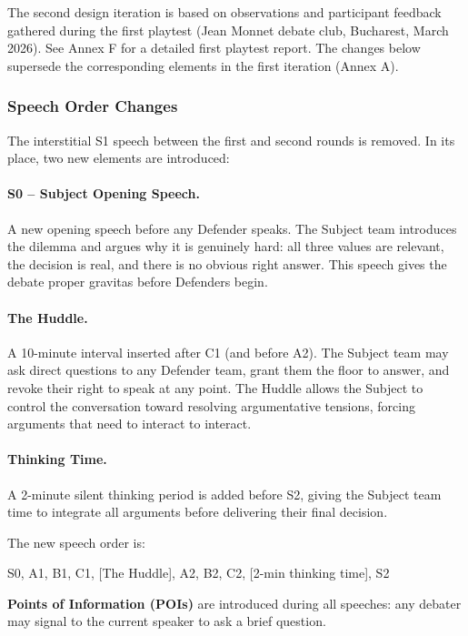 The second design iteration is based on observations and participant feedback gathered during the first playtest (Jean Monnet debate club, Bucharest, March 2026). See Annex F for a detailed first playtest report. The changes below supersede the corresponding elements in the first iteration (Annex A).

\subsubsection{Speech Order Changes}

The interstitial S1 speech between the first and second rounds is removed. In its place, two new elements are introduced:

\paragraph{S0 -- Subject Opening Speech.} A new opening speech before any Defender speaks. The Subject team introduces the dilemma and argues why it is genuinely hard: all three values are relevant, the decision is real, and there is no obvious right answer. This speech gives the debate proper gravitas before Defenders begin.

\paragraph{The Huddle.} A 10-minute interval inserted after C1 (and before A2). The Subject team may ask direct questions to any Defender team, grant them the floor to answer, and revoke their right to speak at any point. The Huddle allows the Subject to control the conversation toward resolving argumentative tensions, forcing arguments that need to interact to interact.

\paragraph{Thinking Time.} A 2-minute silent thinking period is added before S2, giving the Subject team time to integrate all arguments before delivering their final decision.

The new speech order is:

\begin{center}
S0, A1, B1, C1, [The Huddle], A2, B2, C2, [2-min thinking time], S2
\end{center}

\textbf{Points of Information (POIs)} are introduced during all speeches: any debater may signal to the current speaker to ask a brief question.

